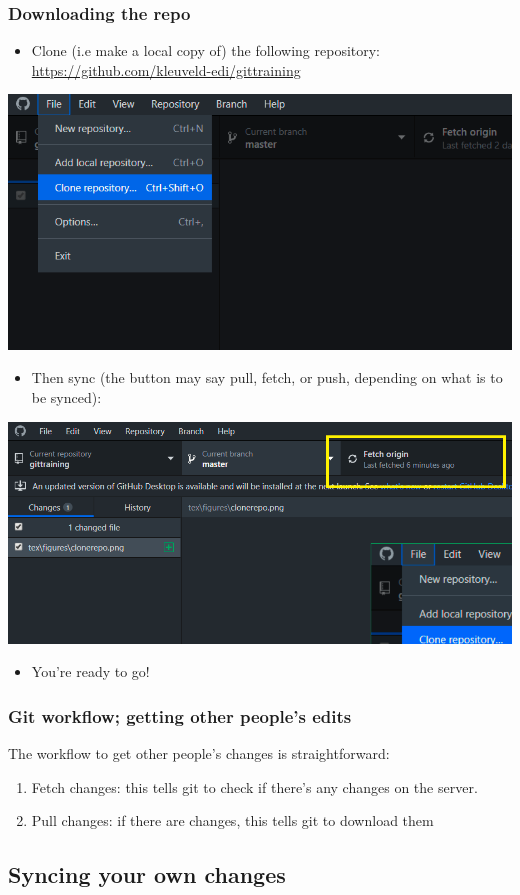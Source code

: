 \documentclass{beamer}
\begin{document}
\begin{frame}
\frametitle{Downloading the repo}
	\begin{itemize}
			\item Clone (i.e make a local copy of) the following repository: \url{https://github.com/kleuveld-edi/gittraining}
	\end{itemize}
	\hfill\includegraphics[width=0.5\linewidth]{figures/clonerepo.png}\hfill\strut
	\begin{itemize}
			\item Then sync (the button may say pull, fetch, or push, depending on what is to be synced):
	\end{itemize}
	\hfill\includegraphics[width=0.5\linewidth]{figures/fetch.png}\hfill\strut
	\begin{itemize}
			\item You're ready to go!
	\end{itemize}
\end{frame}

\begin{frame}
	\frametitle{Git workflow; getting other people's edits}
	The workflow to get other people's changes is straightforward:
	\begin{enumerate}
		\item<2-> Fetch changes: this tells git to check if there's any changes on the server.
		\item<2-> Pull changes: if there are changes, this tells git to download them
	\end{enumerate}
\end{frame}

\subsection{Syncing your own changes}
\end{document}
